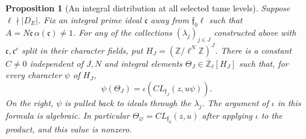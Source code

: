 \documentclass[a4paper,11pt]{article}
\newtheorem{proposition}{Proposition}[section]
\theoremstyle{definition}
\theoremstyle{remark}
\newcommand{\ZZ}{\mathbb Z}\newcommand{\ord}{\operatorname{ord}}
\numberwithin{equation}{section}
\begin{document}
\begin{proposition}[An integral distribution at all selected tame levels]
\leavevmode\label{prop:cmraymeasure731}
Suppose \(\ell\nmid \lvert D_E\rvert\). Fix an integral prime ideal
\(\mathfrak c\) away from \(\mathfrak f_0\ell\) such that
\(A=N\mathfrak c\,\alpha(\mathfrak c)\ne1\). For any of the
collections \((\lambda_j)_{j\in J}\) constructed above with
\(\mathfrak c,\mathfrak c^c\) split in their character fields, put
\(H_J=(\ZZ/\ell^N\ZZ)^J\). There is a constant \(C\ne0\) independent
of \(J,N\) and integral elements
\(\Theta_J\in\overline{\ZZ}_\ell[H_J]\) such that, for every
character \(\psi\) of \(H_J\),
\[
      \psi(\Theta_J)=\iota\!\left(C L_{\mathfrak f_J}(z,u\psi)\right).
      \tag{*}\label{eq:raycritical731}
\]
On the right, \(\psi\) is pulled back to ideals through the
\(\lambda_j\). The argument of \(\iota\) in this formula is
algebraic. In particular \(\Theta_\varnothing=C L_{\mathfrak f_0}(z,u)\)
after applying \(\iota\) to the product, and this value is nonzero.
\end{proposition}
\end{document}
